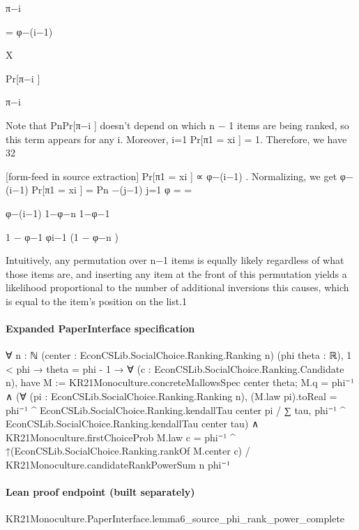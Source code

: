 \documentclass[10pt]{article}
\begin{document}
\begin{ReviewVerbatim}
π−i

= φ−(i−1)

X

Pr[π−i ]

π−i

Note that
PnPr[π−i ] doesn’t depend on which n − 1 items are being ranked, so this term appears for any i.
Moreover, i=1 Pr[π1 = xi ] = 1. Therefore, we have
32


[form-feed in source extraction]
Pr[π1 = xi ] ∝ φ−(i−1) .
Normalizing, we get
φ−(i−1)
Pr[π1 = xi ] = Pn
−(j−1)
j=1 φ
=
=

φ−(i−1)
1−φ−n
1−φ−1

1 − φ−1
φi−1 (1 − φ−n )

Intuitively, any permutation over n−1 items is equally likely regardless of what those items are, and inserting
any item at the front of this permutation yields a likelihood proportional to the number of additional
inversions this causes, which is equal to the item’s position on the list.1
\end{ReviewVerbatim}


\paragraph{Expanded PaperInterface specification}
\begin{ReviewVerbatim}
∀ {n : ℕ} (center : EconCSLib.SocialChoice.Ranking.Ranking n) (phi theta : ℝ),
  1 < phi →
    theta = phi - 1 →
      ∀ (c : EconCSLib.SocialChoice.Ranking.Candidate n),
        have M := KR21Monoculture.concreteMallowsSpec center theta;
        M.q = phi⁻¹ ∧
          (∀ (pi : EconCSLib.SocialChoice.Ranking.Ranking n),
              (M.law pi).toReal =
                phi⁻¹ ^ EconCSLib.SocialChoice.Ranking.kendallTau center pi /
                  ∑ tau, phi⁻¹ ^ EconCSLib.SocialChoice.Ranking.kendallTau center tau) ∧
            KR21Monoculture.firstChoiceProb M.law c =
              phi⁻¹ ^ ↑(EconCSLib.SocialChoice.Ranking.rankOf M.center c) /
                KR21Monoculture.candidateRankPowerSum n phi⁻¹
\end{ReviewVerbatim}

\paragraph{Lean proof endpoint (built separately)}\begin{ReviewVerbatim}
KR21Monoculture.PaperInterface.lemma6_source_phi_rank_power_complete
\end{ReviewVerbatim}
\end{document}
